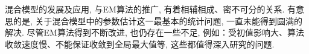 \documentclass[a4paper,12pt,openany,oneside,utf-8]{ctexbook}
\begin{document}
混合模型的发展及应用, 与EM算法的推广, 有着相辅相成、密不可分的关系. 有意思的是, 关于混合模型中的参数估计这一最基本的统计问题, 一直未能得到圆满的解决. 尽管EM算法得到不断改进, 也仍存在一些不足, 例如：受初值影响大、算法收敛速度慢、不能保证收敛到全局最大值等, 这些都值得深入研究的问题.


%
%
\end{document}

